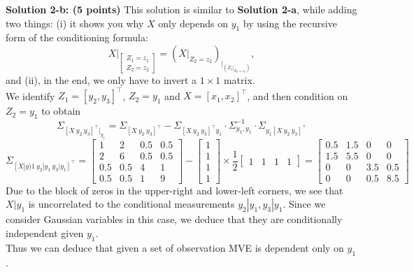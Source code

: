 \documentclass[letterpaper]{article}
\begin{document}
 \noindent \textbf{Solution 2-b: (5 points)} This solution is similar to \textbf{Solution 2-a}, while adding two things: (i) it shows you why $X$ only depends on $y_1$ by using the recursive form of the conditioning formula:
 $$X|_{\begin{bmatrix} Z_1 = z_1 \\ Z_2 =z_2 \end{bmatrix}} = \left( X|_{Z_2= z_2}\right)_{\left.  \right|_{\left(Z_1|_{Z_2=z_2}\right)}},$$
 and (ii), in the end, we only have to invert a $1 \times 1$ matrix.\\

We identify $Z_1=[y_2, y_3]^\top$, $Z_2=y_1$ and $X=[x_1, x_2]^\top$, and then condition on $Z_2=y_1$ to obtain
 $$\Sigma _{[X ~y_2~ y_3]^\top|_{y_1}} = \Sigma _{[X ~y_2~ y_3]^\top} - \Sigma _{[X ~y_2~ y_3]^\top {y_1}} \cdot \Sigma_{y_1, y_1}^{-1} \cdot \Sigma _{{y_1}[X ~y_2~ y_3]^\top }$$
 $$\Sigma _{[X|y)1 ~y_2|y_1~ y_3|y_1]^\top} =
 \begin{bmatrix}1 & 2 & 0.5 & 0.5\\ 2 & 6 & 0.5 & 0.5\\
 0.5 & 0.5  & 4 & 1 \\ 0.5 & 0.5 & 1 &9
 \end{bmatrix} - \begin{bmatrix} 1 \\ 1 \\ 1\\ 1 \end{bmatrix} \times  \dfrac{1}{2}\begin{bmatrix} 1 & 1 & 1& 1 \end{bmatrix} = \begin{bmatrix}0.5 & 1.5 & 0 & 0\\ 1.5 & 5.5 & 0 & 0\\
 0 & 0  & 3.5 & 0.5 \\ 0 & 0 & 0.5 & 8.5
 \end{bmatrix}$$
Due to the block of zeros in the upper-right and lower-left corners, we see that $X|y_1$ is uncorrelated to the conditional measurements $y_2|y_1, y_3|y_1$. Since we consider Gaussian variables in this case, we deduce that they are conditionally independent given $y_1$.\\


 Thus we can deduce that given a set of observation MVE is dependent only on $y_1$.\\
\end{document}
